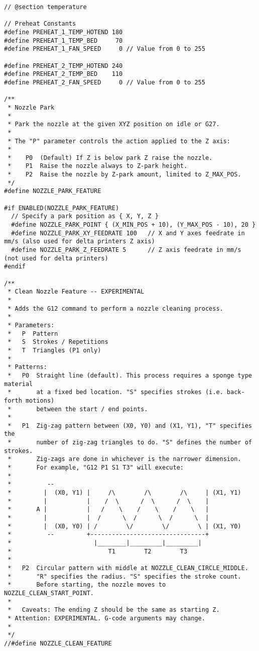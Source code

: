 \begin{lstlisting}
// @section temperature

// Preheat Constants
#define PREHEAT_1_TEMP_HOTEND 180
#define PREHEAT_1_TEMP_BED     70
#define PREHEAT_1_FAN_SPEED     0 // Value from 0 to 255

#define PREHEAT_2_TEMP_HOTEND 240
#define PREHEAT_2_TEMP_BED    110
#define PREHEAT_2_FAN_SPEED     0 // Value from 0 to 255

/**
 * Nozzle Park
 *
 * Park the nozzle at the given XYZ position on idle or G27.
 *
 * The "P" parameter controls the action applied to the Z axis:
 *
 *    P0  (Default) If Z is below park Z raise the nozzle.
 *    P1  Raise the nozzle always to Z-park height.
 *    P2  Raise the nozzle by Z-park amount, limited to Z_MAX_POS.
 */
#define NOZZLE_PARK_FEATURE

#if ENABLED(NOZZLE_PARK_FEATURE)
  // Specify a park position as { X, Y, Z }
  #define NOZZLE_PARK_POINT { (X_MIN_POS + 10), (Y_MAX_POS - 10), 20 }
  #define NOZZLE_PARK_XY_FEEDRATE 100   // X and Y axes feedrate in mm/s (also used for delta printers Z axis)
  #define NOZZLE_PARK_Z_FEEDRATE 5      // Z axis feedrate in mm/s (not used for delta printers)
#endif

/**
 * Clean Nozzle Feature -- EXPERIMENTAL
 *
 * Adds the G12 command to perform a nozzle cleaning process.
 *
 * Parameters:
 *   P  Pattern
 *   S  Strokes / Repetitions
 *   T  Triangles (P1 only)
 *
 * Patterns:
 *   P0  Straight line (default). This process requires a sponge type material
 *       at a fixed bed location. "S" specifies strokes (i.e. back-forth motions)
 *       between the start / end points.
 *
 *   P1  Zig-zag pattern between (X0, Y0) and (X1, Y1), "T" specifies the
 *       number of zig-zag triangles to do. "S" defines the number of strokes.
 *       Zig-zags are done in whichever is the narrower dimension.
 *       For example, "G12 P1 S1 T3" will execute:
 *
 *          --
 *         |  (X0, Y1) |     /\        /\        /\     | (X1, Y1)
 *         |           |    /  \      /  \      /  \    |
 *       A |           |   /    \    /    \    /    \   |
 *         |           |  /      \  /      \  /      \  |
 *         |  (X0, Y0) | /        \/        \/        \ | (X1, Y0)
 *          --         +--------------------------------+
 *                       |________|_________|_________|
 *                           T1        T2        T3
 *
 *   P2  Circular pattern with middle at NOZZLE_CLEAN_CIRCLE_MIDDLE.
 *       "R" specifies the radius. "S" specifies the stroke count.
 *       Before starting, the nozzle moves to NOZZLE_CLEAN_START_POINT.
 *
 *   Caveats: The ending Z should be the same as starting Z.
 * Attention: EXPERIMENTAL. G-code arguments may change.
 *
 */
//#define NOZZLE_CLEAN_FEATURE


\end{lstlisting}
